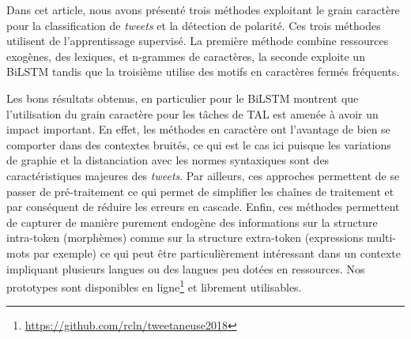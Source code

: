 \label{sec:conclusion}
Dans cet article, nous avons présenté trois méthodes exploitant le grain caractère pour la classification de \textit{tweets} et la détection de polarité.
Ces trois méthodes utilisent de l'apprentissage supervisé.
La première méthode combine ressources exogènes, des lexiques, et n-grammes de caractères, la seconde exploite un BiLSTM tandis que la troisième utilise des motifs en caractères fermés fréquents.

Les bons résultats obtenus, en particulier pour le BiLSTM montrent que l'utilisation du grain caractère pour les tâches de TAL est amenée à avoir un impact important.
En effet, les méthodes en caractère ont l'avantage de bien se comporter dans des contextes bruités, ce qui est le cas ici puisque les variations de graphie et la distanciation avec les normes syntaxiques sont des caractéristiques majeures des \textit{tweets}.
Par ailleurs, ces approches permettent de se passer de pré-traitement ce qui permet de simplifier les chaînes de traitement et par conséquent de réduire les erreurs en cascade\cite{Lejeune-2014}.
Enfin, ces méthodes permettent de capturer de manière purement endogène des informations sur la structure intra-token (morphèmes) comme sur la structure extra-token (expressions multi-mots par exemple) ce qui peut être particulièrement intéressant dans un contexte impliquant plusieurs langues ou des langues peu dotées en ressources.
Nos prototypes sont disponibles en ligne\footnote{\url{https://github.com/rcln/tweetaneuse2018}} et librement utilisables.



